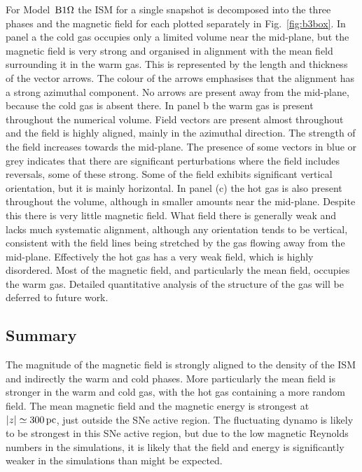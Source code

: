 \documentclass[useAMS,usenatbib]{mn2e}
\begin{document}
  For Model~${\mathrm{B}1\rm{\Omega} }$ the ISM for a single snapshot is decomposed into the 
  three phases and the magnetic field for each plotted separately in 
  Fig.~\ref{fig:b3box}.
  In panel a the cold gas occupies only a limited volume near the mid-plane, 
  but the magnetic field is very strong and organised in alignment with the
  mean field surrounding it in the warm gas. 
  This is represented by the length and thickness of the vector arrows.  
  The colour of the arrows emphasises that the alignment has a strong 
  azimuthal component. 
  No arrows are present away from the mid-plane, because the cold gas is absent 
  there.
  In panel b the warm gas is present throughout the numerical volume.
  Field vectors are present almost throughout and the field is highly aligned,
  mainly in the azimuthal direction. 
  The strength of the field increases towards the mid-plane.
  The presence of some vectors in blue or grey indicates that there are 
  significant perturbations where the field includes reversals, some of these
  strong.
  Some of the field exhibits significant vertical orientation, but it is 
  mainly horizontal.
  In panel (c) the hot gas is also present throughout the volume, although 
  in smaller amounts near the mid-plane. 
  Despite this there is very little magnetic field.
  What field there is generally weak and lacks much systematic alignment, 
  although any orientation tends to be vertical, consistent with the
  field lines being stretched by the gas flowing away from the mid-plane. 
  Effectively the hot gas has a very weak field, which is highly disordered.
  Most of the magnetic field, and particularly the mean field, occupies the 
  warm gas.
  Detailed quantitative analysis of the structure of the gas will be deferred to
  future work.

  \subsection{Summary}
  The magnitude of the magnetic field is strongly aligned to the density of the
  ISM and indirectly the warm and cold phases.
  More particularly the mean field is stronger in the warm and cold gas, with 
  the hot gas containing a more random field. 
  The mean magnetic field and the magnetic energy is strongest at 
  $|z|\simeq300\,{\rm pc}$, just outside the SNe active region. 
  The fluctuating dynamo is likely to be strongest in this SNe active region,
  but due to the low magnetic Reynolds numbers in the simulations, it is likely
  that the field and energy is significantly weaker in the simulations than 
  might be expected.
\end{document}
